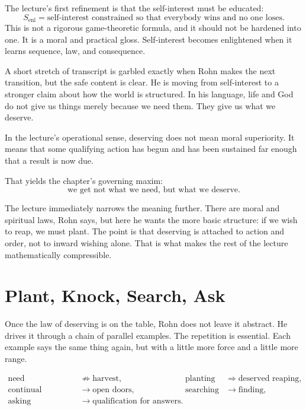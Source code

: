 The lecture's first refinement is that the self-interest must be educated:
\begin{equation}
S_{\mathrm{enl}}=\text{self-interest constrained so that everybody wins and no one loses}.
\end{equation}
This is not a rigorous game-theoretic formula, and it should not be hardened into one. It is a moral and practical gloss. Self-interest becomes enlightened when it learns sequence, law, and consequence.

A short stretch of transcript is garbled exactly when Rohn makes the next transition, but the safe content is clear. He is moving from self-interest to a stronger claim about how the world is structured. In his language, life and God do not give us things merely because we need them. They give us what we deserve.

\begin{definition}
In the lecture's operational sense, deserving does not mean moral superiority. It means that some qualifying action has begun and has been sustained far enough that a result is now due.
\end{definition}

That yields the chapter's governing maxim:
\begin{equation}
\text{we get not what we need, but what we deserve}.
\end{equation}

The lecture immediately narrows the meaning further. There are moral and spiritual laws, Rohn says, but here he wants the more basic structure: if we wish to reap, we must plant. The point is that deserving is attached to action and order, not to inward wishing alone. That is what makes the rest of the lecture mathematically compressible.

\section{Plant, Knock, Search, Ask}

Once the law of deserving is on the table, Rohn does not leave it abstract. He drives it through a chain of parallel examples. The repetition is essential. Each example says the same thing again, but with a little more force and a little more range.

\begin{align}
\text{need} &\not\Rightarrow \text{harvest}, &
\text{planting} &\Rightarrow \text{deserved reaping}, \\
\text{continual knocking} &\rightarrow \text{open doors}, &
\text{searching} &\rightarrow \text{finding}, \\
\text{asking} &\rightarrow \text{qualification for answers}. &&
\end{align}

